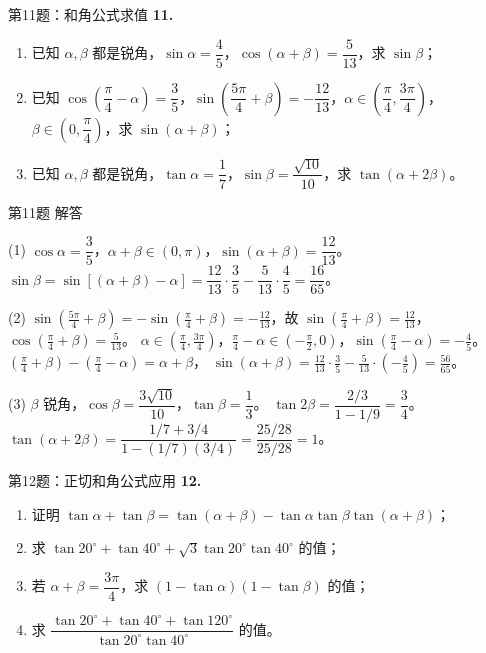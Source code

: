 \documentclass[10pt,aspectratio=169,serif]{beamer}
\begin{document}
\begin{frame}[t]{第11题：和角公式求值}
\textbf{11.}
\begin{enumerate}
  \item 已知 $\alpha,\beta$ 都是锐角，$\sin\alpha=\dfrac45$，$\cos(\alpha+\beta)=\dfrac5{13}$，求 $\sin\beta$；
  \item 已知 $\cos\!\left(\dfrac{\pi}{4}-\alpha\right)=\dfrac35$，$\sin\!\left(\dfrac{5\pi}{4}+\beta\right)=-\dfrac{12}{13}$，$\alpha\in\left(\dfrac{\pi}{4},\dfrac{3\pi}{4}\right)$，$\beta\in\left(0,\dfrac{\pi}{4}\right)$，求 $\sin(\alpha+\beta)$；
  \item 已知 $\alpha,\beta$ 都是锐角，$\tan\alpha=\dfrac17$，$\sin\beta=\dfrac{\sqrt{10}}{10}$，求 $\tan(\alpha+2\beta)$。
\end{enumerate}
\end{frame}

\begin{frame}[t]{第11题 解答}
\begin{tcolorbox}[colback=orange!10,colframe=orange,title=\textbf{解}]
(1) $\cos\alpha=\dfrac35$，$\alpha+\beta\in(0,\pi)$，$\sin(\alpha+\beta)=\dfrac{12}{13}$。
$\sin\beta=\sin[(\alpha+\beta)-\alpha]=\dfrac{12}{13}\cdot\dfrac35-\dfrac5{13}\cdot\dfrac45=\dfrac{16}{65}$。

(2) $\sin(\frac{5\pi}{4}+\beta)=-\sin(\frac{\pi}{4}+\beta)=-\frac{12}{13}$，故 $\sin(\frac{\pi}{4}+\beta)=\frac{12}{13}$，$\cos(\frac{\pi}{4}+\beta)=\frac5{13}$。
$\alpha\in(\frac{\pi}{4},\frac{3\pi}{4})$，$\frac{\pi}{4}-\alpha\in(-\frac{\pi}{2},0)$，$\sin(\frac{\pi}{4}-\alpha)=-\frac45$。
$(\frac{\pi}{4}+\beta)-(\frac{\pi}{4}-\alpha)=\alpha+\beta$，
$\sin(\alpha+\beta)=\frac{12}{13}\cdot\frac35-\frac5{13}\cdot(-\frac45)=\frac{56}{65}$。

(3) $\beta$ 锐角，$\cos\beta=\dfrac{3\sqrt{10}}{10}$，$\tan\beta=\dfrac13$。
$\tan 2\beta=\dfrac{2/3}{1-1/9}=\dfrac34$。
$\tan(\alpha+2\beta)=\dfrac{1/7+3/4}{1-(1/7)(3/4)}=\dfrac{25/28}{25/28}=1$。
\end{tcolorbox}
\end{frame}

\begin{frame}[t]{第12题：正切和角公式应用}
\textbf{12.}
\begin{enumerate}
  \item 证明 $\tan\alpha+\tan\beta=\tan(\alpha+\beta)-\tan\alpha\tan\beta\tan(\alpha+\beta)$；
  \item 求 $\tan20^\circ+\tan40^\circ+\sqrt3\tan20^\circ\tan40^\circ$ 的值；
  \item 若 $\alpha+\beta=\dfrac{3\pi}{4}$，求 $(1-\tan\alpha)(1-\tan\beta)$ 的值；
  \item 求 $\dfrac{\tan20^\circ+\tan40^\circ+\tan120^\circ}{\tan20^\circ\tan40^\circ}$ 的值。
\end{enumerate}
\end{frame}
\end{document}
